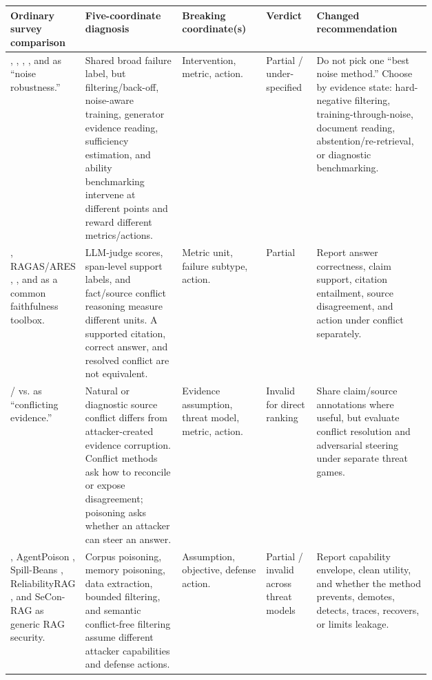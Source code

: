 \begin{table}[t]
\centering
\tiny
\renewcommand{\arraystretch}{0.88}
\begin{tabularx}{\linewidth}{>{\raggedright\arraybackslash}p{0.16\linewidth}>{\raggedright\arraybackslash}p{0.23\linewidth}>{\raggedright\arraybackslash}p{0.20\linewidth}>{\raggedright\arraybackslash}p{0.12\linewidth}X}
\toprule
\textbf{Ordinary survey comparison} & \textbf{Five-coordinate diagnosis} & \textbf{Breaking coordinate(s)} & \textbf{Verdict} & \textbf{Changed recommendation} \\
\midrule
\cite{irrelevantContext2023}, \cite{raat2024}, \cite{chainOfNote2023}, \cite{sufficientContext2024}, and \cite{rgb2023} as ``noise robustness.'' & Shared broad failure label, but filtering/back-off, noise-aware training, generator evidence reading, sufficiency estimation, and ability benchmarking intervene at different points and reward different metrics/actions. & Intervention, metric, action. & Partial / under-specified & Do not pick one ``best noise method.'' Choose by evidence state: hard-negative filtering, training-through-noise, document reading, abstention/re-retrieval, or diagnostic benchmarking. \\
\cite{ragTruth2024}, RAGAS/ARES \cite{ragas2024,ares2024}, \cite{faithfulRAG2025}, and \cite{astuteRAG2025} as a common faithfulness toolbox. & LLM-judge scores, span-level support labels, and fact/source conflict reasoning measure different units. A supported citation, correct answer, and resolved conflict are not equivalent. & Metric unit, failure subtype, action. & Partial & Report answer correctness, claim support, citation entailment, source disagreement, and action under conflict separately. \\
\cite{faithfulRAG2025} / \cite{astuteRAG2025} vs. \cite{poisonedRAG2024} as ``conflicting evidence.'' & Natural or diagnostic source conflict differs from attacker-created evidence corruption. Conflict methods ask how to reconcile or expose disagreement; poisoning asks whether an attacker can steer an answer. & Evidence assumption, threat model, metric, action. & Invalid for direct ranking & Share claim/source annotations where useful, but evaluate conflict resolution and adversarial steering under separate threat games. \\
\cite{poisonedRAG2024}, AgentPoison \cite{rrag053}, Spill-Beans \cite{venue200SpillBeans}, ReliabilityRAG \cite{rrag021}, and SeCon-RAG \cite{rrag017} as generic RAG security. & Corpus poisoning, memory poisoning, data extraction, bounded filtering, and semantic conflict-free filtering assume different attacker capabilities and defense actions. & Assumption, objective, defense action. & Partial / invalid across threat models & Report capability envelope, clean utility, and whether the method prevents, demotes, detects, traces, recovers, or limits leakage. \\

\end{tabularx}
\end{table}
